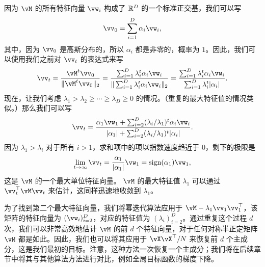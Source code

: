 \documentclass[../../book-main_zh.tex]{subfiles}
\begin{document}
因为 \(\vM\) 的所有特征向量 \(\vw_{i}\) 构成了 \(\mathbb{R}^{D}\) 的一个标准正交基，我们可以写
\begin{equation}
    \vv_{0} = \sum_{i = 1}^{D}\alpha_{i}\vw_{i},
\end{equation}
其中，因为 \(\vv_{0}\) 是高斯分布的，所以 \(\alpha_{i}\) 都是非零的，概率为 \(1\)。因此，我们可以使用我们之前对 \(\vv_{t}\) 的表达式来写
\begin{equation}
    \vv_{t} = \frac{\vM^{t}\vv_{0}}{\norm{\vM^{t}\vv_{0}}_{2}} = \frac{\sum_{i = 1}^{D}\lambda_{i}^{t}\alpha_{i}\vw_{i}}{\norm{\sum_{i = 1}^{D}\lambda_{i}^{t}\alpha_{i}\vw_{i}}_{2}} = \frac{\sum_{i = 1}^{D}\lambda_{i}^{t}\alpha_{i}\vw_{i}}{\sum_{i = 1}^{D}\lambda_{i}^{t}\abs{\alpha_{i}}}. 
\end{equation}
现在，让我们考虑 \(\lambda_{1} > \lambda_{2} \geq \cdots \geq \lambda_{D} \geq 0\) 的情况。（重复的最大特征值的情况类似。）那么我们可以写
\begin{equation}
    \vv_{t} = \frac{\alpha_{1}\vw_{1} + \sum_{i = 2}^{D}(\lambda_{i}/\lambda_{1})^{t}\alpha_{i}\vw_{i}}{\abs{\alpha_{1}} + \sum_{i = 2}^{D}(\lambda_{i}/\lambda_{1})^{t}\abs{\alpha_{i}}}.
\end{equation}
因为 \(\lambda_{1} > \lambda_{i}\) 对于所有 \(i > 1\)，求和项中的项以指数速度趋近于 \(0\)，剩下的极限是
\begin{equation}
    \lim_{t \to \infty}\vv_{t} = \frac{\alpha_{1}}{\abs{\alpha_{1}}}\vw_{1} = \sign(\alpha_{1})\vw_{1},
\end{equation}
这是 \(\vM\) 的一个最大单位特征向量。 \(\vM\) 的最大特征值 \(\lambda_{1}\) 可以通过 \(\vv_{t}^{\top}\vM\vv_{t}\) 来估计，这同样迅速地收敛到 \(\lambda_{1}\)。

为了找到第二个最大特征向量，我们将幂迭代算法应用于 \(\vM - \lambda_{1}\vv_{1}\vv_{1}^{\top}\)，该矩阵的特征向量为 \((\vw_{i})_{i = 2}^{D}\)，对应的特征值为 \((\lambda_{i})_{i = 2}^{D}\)。通过重复这个过程 \(d\) 次，我们可以非常高效地估计 \(\vM\) 的前 \(d\) 个特征向量，对于任何对称半正定矩阵 \(\vM\) 都是如此。因此，我们也可以将其应用于 \(\vX\vX^{\top}/N\) 来恢复前 \(d\) 个主成分，这是我们最初的目标。注意，这种方法一次恢复一个主成分；我们将在后续章节中将其与其他算法方法进行对比，例如全局目标函数的梯度下降。


\end{document}
